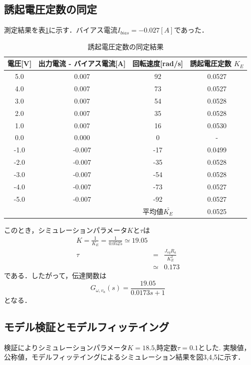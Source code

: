 \documentclass[11pt,a4paper]{jsarticle}
\begin{document}
\newpage


  \subsection{誘起電圧定数の同定}
  測定結果を表\ref{table2}に示す．バイアス電流$I_{bias} = -0.027[A]$であった．\\
   \begin{table}[b]
    \begin{center}
     \caption{誘起電圧定数の同定結果}
     \begin{tabular}{|c|c|c|c|} \hline
      電圧[V] & 出力電流 - バイアス電流[A] & 回転速度[rad/s] & 誘起電圧定数 $K_E$ \\ \hline \hline
      5.0 & 0.007 & 92 & 0.0527 \\ \hline
      4.0 & 0.007 & 73 & 0.0527 \\ \hline
      3.0 & 0.007 & 54 & 0.0528 \\ \hline
      2.0 & 0.007 & 35 & 0.0528 \\ \hline
      1.0 & 0.007 & 16 & 0.0530 \\ \hline
      0.0 & 0.000 & 0 & - \\ \hline
      -1.0 & -0.007 & -17 & 0.0499 \\ \hline
      -2.0 & -0.007 & -35 & 0.0528 \\ \hline
      -3.0 & -0.007 & -54 & 0.0528 \\ \hline
      -4.0 & -0.007 & -73 & 0.0527 \\ \hline
      -5.0 & -0.007 & -92 & 0.0527 \\ \hline
      & & 平均値$\bar{K_E}$ & 0.0525 \\ \hline
     \end{tabular}
     \label{table2}
    \end{center}
   \end{table}
   このとき，シミュレーションパラメータ$K$と$\tau$は
   \begin{eqnarray}
    K = \frac{1}{K_E} = \frac{1}{0.0525} \simeq 19.05 \\
    \tau & = & \frac{J_{eq} R_a}{K_E^2} \nonumber \\
    & \simeq & 0.173
   \end{eqnarray}
   である．したがって，伝達関数は
   \begin{equation}
    G_{\omega , v_a}(s) = \frac{19.05}{0.0173s+1}
   \end{equation}
   となる．
  \subsection{モデル検証とモデルフィッテイング}
  検証によりシミュレーションパラメータ$K = 18.5$,時定数$\tau = 0.1$とした.
  実験値，公称値，モデルフィッテイングによるシミュレーション結果を図3,4,5に示す．
\end{document}
